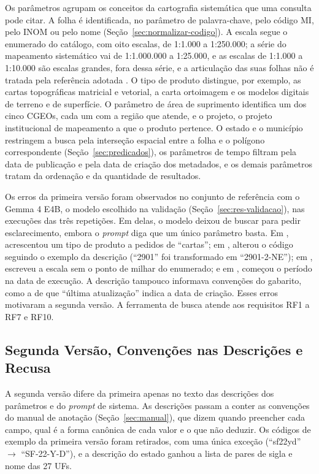Os parâmetros agrupam os conceitos da cartografia sistemática que uma consulta pode citar. A folha é identificada, no parâmetro de palavra-chave, pelo código MI, pelo INOM ou pelo nome (Seção~\ref{sec:normalizar-codigo}). A escala segue o enumerado do catálogo, com oito escalas, de 1:1.000 a 1:250.000; a série do mapeamento sistemático vai de 1:1.000.000 a 1:25.000, e as escalas de 1:1.000 a 1:10.000 são escalas grandes, fora dessa série, e a articulação das suas folhas não é tratada pela referência adotada \cite{ibge1999nocoes}. O tipo de produto distingue, por exemplo, as cartas topográficas matricial e vetorial, a carta ortoimagem e os modelos digitais de terreno e de superfície. O parâmetro de área de suprimento identifica um dos cinco CGEOs, cada um com a região que atende, e o projeto, o projeto institucional de mapeamento a que o produto pertence. O estado e o município restringem a busca pela interseção espacial entre a folha e o polígono correspondente (Seção~\ref{sec:predicados}), os parâmetros de tempo filtram pela data de publicação e pela data de criação dos metadados, e os demais parâmetros tratam da ordenação e da quantidade de resultados.

Os erros da primeira versão foram observados no conjunto de referência com o Gemma 4 E4B, o modelo escolhido na validação (Seção~\ref{sec:res-validacao}), nas  execuções das três repetições. Em  delas, o modelo deixou de buscar para pedir esclarecimento, embora o \textit{prompt} diga que um único parâmetro basta. Em , acrescentou um tipo de produto a pedidos de ``cartas''; em , alterou o código seguindo o exemplo da descrição (``2901'' foi transformado em ``2901-2-NE''); em , escreveu a escala sem o ponto de milhar do enumerado; e em , começou o período na data de execução. A descrição tampouco informava convenções do gabarito, como a de que ``última atualização'' indica a data de criação. Esses erros motivaram a segunda versão. A ferramenta de busca atende aos requisitos RF1 a RF7 e RF10.

\subsection{Segunda Versão, Convenções nas Descrições e Recusa}
\label{sec:segunda-versao}

A segunda versão difere da primeira apenas no texto das descrições dos parâmetros e do \textit{prompt} de sistema. As descrições passam a conter as convenções do manual de anotação (Seção~\ref{sec:manual}), que dizem quando preencher cada campo, qual é a forma canônica de cada valor e o que não deduzir. Os códigos de exemplo da primeira versão foram retirados, com uma única exceção (``sf22yd'' $\rightarrow$ ``SF-22-Y-D''), e a descrição do estado ganhou a lista de pares de sigla e nome das 27 UFs.


